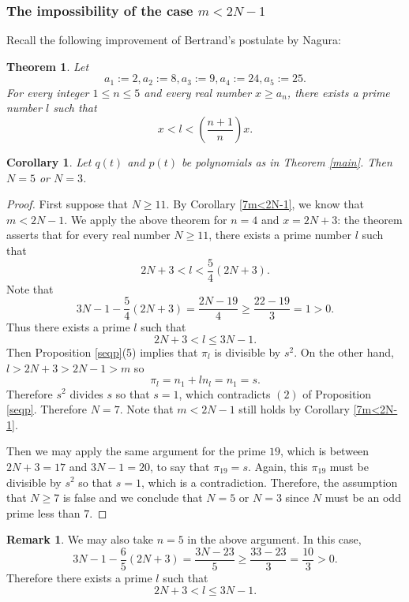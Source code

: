 \documentclass[reqno]{amsart}
\numberwithin{equation}{section}
\theoremstyle{plain}
\newtheorem{thm}[equation]{Theorem}
\newtheorem{cor}[equation]{Corollary}
\theoremstyle{definition}
\newtheorem{rem}[equation]{Remark}
\begin{document}
\subsubsection{The impossibility of the case $m<2N-1$}\label{Na2}

Recall the following improvement of Bertrand's postulate by Nagura:

\begin{thm}\cite{Nagura}
    Let 
    $$a_1:=2, a_2:=8, a_3:=9, a_4:=24, a_5:=25.$$
    For every integer $1\leq n\leq 5$ and every real number $x\geq a_n$, there exists a prime number $l$ such that
    $$x<l<\left(\frac{n+1}{n}\right)x.$$
\end{thm}
\begin{cor}\label{2N-1}
    Let $q(t)$ and $p(t)$ be polynomials as in Theorem \ref{main}. Then  $N=5$ or $N=3$.
\end{cor}
\begin{proof}
First suppose that $N\geq 11$. By Corollary \ref{7m<2N-1}, we know that $m<2N-1$. We apply the above theorem for $n=4$ and $x=2N+3$: the theorem asserts that for every real number $N \geq 11$, there exists a prime number $l$ such that
$$2N+3<l<\frac{5}{4}(2N+3).$$
Note that 
$$3N-1-\frac{5}{4}(2N+3)=\frac{2N-19}{4}\geq\frac{22-19}{3}=1>0.$$
Thus there exists a prime $l$ such that $$2N+3<l\leq3N-1.$$
Then Proposition \ref{seqp}(5) implies that $\pi_l$ is divisible by $s^2$. On the other hand, $l>2N+3>2N-1>m$ so
$$\pi_l=n_1+ln_l=n_1=s.$$
Therefore $s^2$ divides $s$ so that $s=1$, which contradicts $(2)$ of Proposition \ref{seqp}. Therefore $N=7$. Note that $m<2N-1$ still holds by Corollary \ref{7m<2N-1}.

Then we may apply the same argument for the prime $19$, which is between $2N+3=17$ and $3N-1=20$, to say that
$\pi_{19}=s$. Again, this $\pi_{19}$ must be divisible by $s^2$ so that $s=1$, which is a contradiction. Therefore, the assumption that $N\geq 7$ is false and we conclude that $N=5$ or $N=3$ since $N$ must be an odd prime less than $7$. 
\end{proof}

\begin{rem}
We may also take $n=5$ in the above argument. In this case,
$$3N-1-\frac{6}{5}(2N+3)=\frac{3N-23}{5}\geq\frac{33-23}{3}=\frac{10}{3}>0.$$
Therefore there exists a prime $l$ such that $$2N+3<l\leq3N-1.$$
\end{rem}

\end{document}
